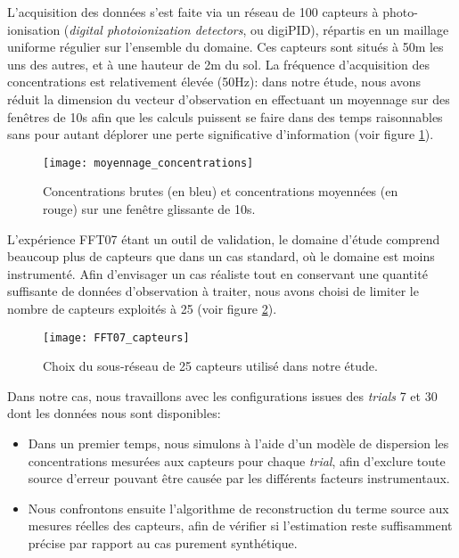 L'acquisition des données s'est faite via un réseau de 100 capteurs à photo-ionisation (\textit{digital photoionization detectors}, ou digiPID), répartis en un maillage uniforme régulier sur l'ensemble du domaine. Ces capteurs sont situés à 50m les uns des autres, et à une hauteur de 2m du sol. La fréquence d'acquisition des concentrations est relativement élevée (50Hz): dans notre étude, nous avons réduit la dimension du vecteur d'observation en effectuant un moyennage sur des fenêtres de 10s afin que les calculs puissent se faire dans des temps raisonnables sans pour autant déplorer une perte significative d'information (voir figure \ref{fig_AE_3}).

\begin{figure}[h!]
	\centering
	\texttt{[image: moyennage\_concentrations]}
	\caption{Concentrations brutes (en bleu) et concentrations moyennées (en rouge) sur une fenêtre glissante de 10s. }
	\label{fig_AE_3}
\end{figure}


L'expérience FFT07 étant un outil de validation, le domaine d'étude comprend beaucoup plus de capteurs que dans un cas standard, où le domaine est moins instrumenté. Afin d'envisager un cas réaliste tout en conservant une quantité suffisante de données d'observation à traiter, nous avons choisi de limiter le nombre de capteurs {exploités} à 25 (voir figure \ref{fig_AE_4}).

\begin{figure}[h!]
	\centering
	\texttt{[image: FFT07\_capteurs]}
	\caption{Choix du sous-réseau de 25 capteurs utilisé dans notre étude.}
	\label{fig_AE_4}
\end{figure}

Dans notre cas, nous travaillons avec les configurations issues des \textit{trials} 7 et 30 {dont les données nous sont disponibles}: 
\begin{itemize}
	\item Dans un premier temps, nous simulons à l'aide d'un modèle de dispersion les concentrations mesurées aux capteurs pour chaque \textit{trial}, afin d'exclure toute source d'erreur pouvant être causée par les différents facteurs instrumentaux.
	\item Nous confrontons ensuite l'algorithme de reconstruction du terme source aux mesures réelles des capteurs, afin de vérifier si l'estimation reste suffisamment précise par rapport au cas purement synthétique.
\end{itemize}



